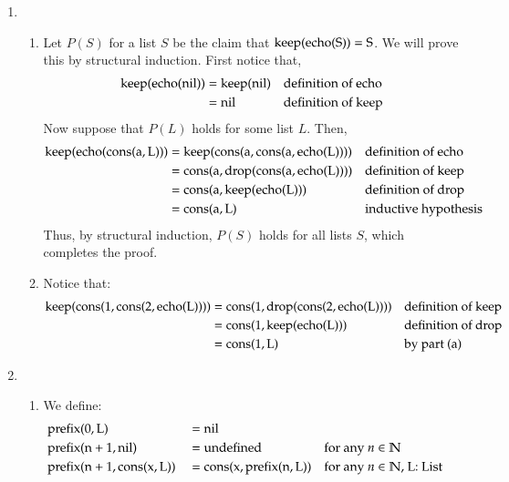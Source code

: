 \documentclass[12pt]{article}
\theoremstyle{definitionstyle}
\def\mbb#1{\mathbb{#1}}
\begin{document}
\begin{enumerate}[leftmargin=\labelsep]
        \newpage
        \item \begin{enumerate}[label=(\alph*)]
            \item Let $P(S)$ for a list $S$ be the claim that $\rm{keep}(\rm{echo}(S)) = S$. We will prove this by structural induction. First notice that,
            \[\begin{aligned}
                \rm keep(echo(nil)) &= \rm keep(nil) && \text{definition of echo} \\
                &= \rm nil && \text{definition of keep}
            \end{aligned}\]
            Now suppose that $P(L)$ holds for some list $L$. Then,
            \[\begin{aligned}
                \rm keep(echo(cons(a, L))) &= \rm keep(cons(a, cons(a, echo(L)))) && \text{definition of echo} \\
                &= \rm cons(a, drop(cons(a, echo(L)))) && \text{definition of keep} \\
                &= \rm cons(a, keep(echo(L))) && \text{definition of drop} \\
                &= \rm cons(a, L) && \text{inductive hypothesis} \\
            \end{aligned}\]
            Thus, by structural induction, $P(S)$ holds for all lists $S$, which completes the proof.

            \item Notice that:
            \[\begin{aligned}
                \rm keep(cons(1, cons(2, echo(L)))) &= \rm cons(1, drop(cons(2, echo(L)))) && \text{definition of keep} \\
                &= \rm cons(1, keep(echo(L))) && \text{definition of drop} \\
                &= \rm cons(1, L) && \text{by part (a)}
            \end{aligned}\]
        \end{enumerate}

        \newpage
        \item \begin{enumerate}[label=(\alph*)]
            \item We define:
            \[\begin{aligned}
                &\rm prefix(0, L) &&= \rm nil \\
                &\rm prefix(n+1, nil) &&= \rm undefined && \text{for any $n \in \mbb N$}\\
                &\rm prefix(n+1, \rm cons(x, L)) &&= \rm cons(x, \rm prefix(n, L)) && \text{for any $n \in \mbb N$, L: List}
            \end{aligned}\]


\end{enumerate}
\end{enumerate}
\end{document}
